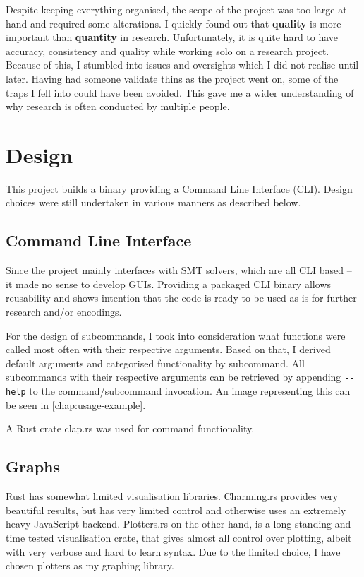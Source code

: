 \documentclass[a4paper]{report}
\begin{document}
Despite keeping everything organised, the scope of the project was too large at hand and required some alterations.
I quickly found out that \textbf{quality} is more important than \textbf{quantity} in research.
Unfortunately, it is quite hard to have accuracy, consistency and quality while working solo on a research project.
Because of this, I stumbled into issues and oversights which I did not realise until later.
Having had someone validate thins as the project went on, some of the traps I fell into could have been avoided.
This gave me a wider understanding of why research is often conducted by multiple people.

\section{Design}
This project builds a binary providing a Command Line Interface (CLI).
Design choices were still undertaken in various manners as described below.

\subsection{Command Line Interface}
Since the project mainly interfaces with SMT solvers, which are all CLI based -- it made no sense to develop GUIs.
Providing a packaged CLI binary allows reusability and shows intention that the code is ready to be used as is for further
research and/or encodings.

For the design of subcommands, I took into consideration what functions were called most often with their respective arguments.
Based on that, I derived default arguments and categorised functionality by subcommand.
All subcommands with their respective arguments can be retrieved by appending \verb|--help| to the command/subcommand invocation.
An image representing this can be seen in \ref{chap:usage-example}.

A Rust crate clap.rs was used for command functionality. \cite{cargo:clap}

\subsection{Graphs}
\label{ssec:graph-design}
Rust has somewhat limited visualisation libraries.
Charming.rs provides very beautiful results, but has very limited control and otherwise uses an extremely heavy JavaScript backend. \cite{cargo:charming}
Plotters.rs on the other hand, is a long standing and time tested visualisation crate,
that gives almost all control over plotting, albeit with very verbose and hard to learn syntax. \cite{cargo:plotters}
Due to the limited choice, I have chosen plotters as my graphing library.
\end{document}
